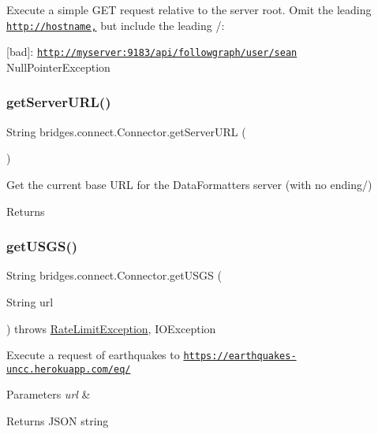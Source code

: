 Execute a simple G\+ET request relative to the server root. Omit the leading \href{http://hostname,}{\tt http\+://hostname,} but include the leading /\+:

\mbox{[}bad\mbox{]}\+: \href{http://myserver:9183/api/followgraph/user/sean}{\tt http\+://myserver\+:9183/api/followgraph/user/sean} Null\+Pointer\+Exception \hypertarget{classbridges_1_1connect_1_1_connector_a0b9809180aac96a83e31e224ab5ed6ec}{}\label{classbridges_1_1connect_1_1_connector_a0b9809180aac96a83e31e224ab5ed6ec} 
\subsubsection{\texorpdfstring{get\+Server\+U\+R\+L()}{getServerURL()}}
{\footnotesize\ttfamily String bridges.\+connect.\+Connector.\+get\+Server\+U\+RL (\begin{DoxyParamCaption}{ }\end{DoxyParamCaption})}

Get the current base U\+RL for the Data\+Formatters server (with no ending/) \begin{DoxyReturn}{Returns}

\end{DoxyReturn}
\hypertarget{classbridges_1_1connect_1_1_connector_a1781405c9b38c338bce042bf7ff23eaf}{}\label{classbridges_1_1connect_1_1_connector_a1781405c9b38c338bce042bf7ff23eaf} 
\subsubsection{\texorpdfstring{get\+U\+S\+G\+S()}{getUSGS()}}
{\footnotesize\ttfamily String bridges.\+connect.\+Connector.\+get\+U\+S\+GS (\begin{DoxyParamCaption}\item[{String}]{url }\end{DoxyParamCaption}) throws \hyperlink{classbridges_1_1validation_1_1_rate_limit_exception}{Rate\+Limit\+Exception}, I\+O\+Exception}

Execute a request of earthquakes to \href{https://earthquakes-uncc.herokuapp.com/eq/}{\tt https\+://earthquakes-\/uncc.\+herokuapp.\+com/eq/} 
\begin{DoxyParams}{Parameters}
{\em url} & \\
\hline
\end{DoxyParams}
\begin{DoxyReturn}{Returns}
J\+S\+ON string 
\end{DoxyReturn}

